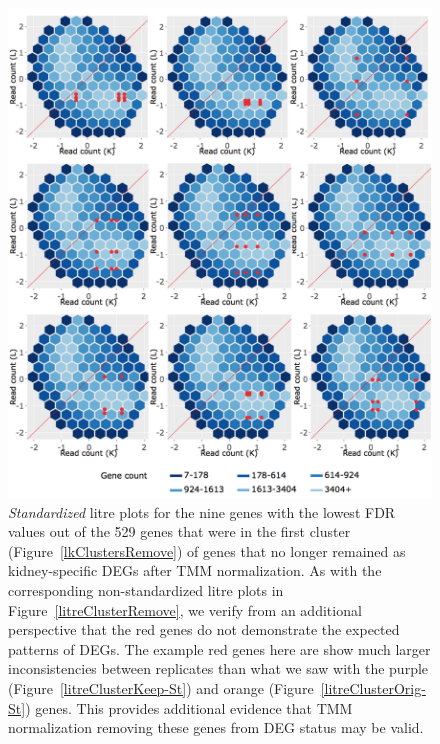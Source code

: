 \documentclass{article}
\begin{document}
  \null
  \begin{figure}[t!]
  \centerline{\includegraphics[width=\columnwidth]{../MakeFigures/Dashboards/litreClusterRemove-St/litreClusterRemove-St.jpg}}
  \caption{\textit{Standardized} litre plots for the nine genes with the lowest FDR values out of the 529 genes that were in the first cluster (Figure~\ref{lkClustersRemove}) of genes that no longer remained as kidney-specific DEGs after TMM normalization. As with the corresponding non-standardized litre plots in Figure~\ref{litreClusterRemove}, we verify from an additional perspective that the red genes do not demonstrate the expected patterns of DEGs. The example red genes here are show much larger inconsistencies between replicates than what we saw with the purple (Figure~\ref{litreClusterKeep-St}) and orange (Figure~\ref{litreClusterOrig-St}) genes. This provides additional evidence that TMM normalization removing these genes from DEG status may be valid.
  \label{litreClusterRemove-St}}
  \end{figure}
  
\end{document}
